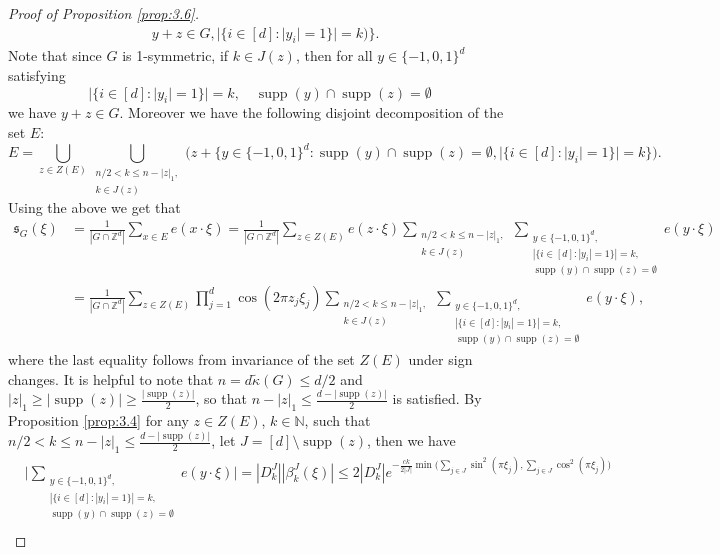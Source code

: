 \documentclass[a4paper,oneside, reqno]{amsart}
\numberwithin{equation}{section}
\theoremstyle{definition}%
\theoremstyle{definition}
\theoremstyle{definition}%
\theoremstyle{definition}
\newcommand{\Z}{\mathbb{Z}}
\newcommand{\N}{\mathbb{N}}
\DeclareMathOperator{\supp}{supp}
\begin{document}
\begin{proof}[Proof of Proposition \ref{prop:3.6}]
\begin{align*}
    &y+z \in G,|\{i \in [d]: |y_i|=1 \}|=k \Big)\Big\}.
\end{align*}
Note that since $G$ is 1-symmetric, if $k \in J(z)$, then for all $y \in \{-1,0,1\}^d$ satisfying
\[
|\{i \in [d]: |y_i|=1 \}|=k, \quad \supp(y) \cap \supp(z)= \emptyset
\]
we have $y+z \in G$.
Moreover we have the following disjoint decomposition of the set $E$:
\[
E= \bigcup_{z \in Z(E)} \bigcup_{\substack{n/2<k \leq n-|z|_1, \\ k \in J(z)}} \Big(z+ \Big\{y \in \{-1,0,1\}^d: \supp(y) \cap \supp(z)= \emptyset, |\{i \in [d]: |y_i|=1 \}|=k\Big\}\Big).
\]
Using the above we get that
\begin{equation} \label{eq:3.9}
 \begin{split} 
    \mathfrak{s}_G(\xi)&= \frac{1}{|G\cap \Z^d|} \sum_{x \in E} e(x \cdot \xi)= \frac{1}{|G\cap \Z^d|}\sum_{z \in Z(E)} e(z \cdot \xi) \sum_{\substack{n/2<k \leq n-|z|_1, \\ k \in J(z)}} \sum_{\substack{y \in \{-1,0,1\}^d, \\ |\{i \in [d]: |y_i|=1\}|=k, \\
    \supp(y) \cap \supp(z)= \emptyset}} e(y \cdot \xi)
    \\
    &=\frac{1}{|G\cap \Z^d|}\sum_{z \in Z(E)} \prod_{j=1}^d \cos(2 \pi z_j \xi_j) \sum_{\substack{n/2<k \leq n-|z|_1, \\ k \in J(z)}} \sum_{\substack{y \in \{-1,0,1\}^d, \\ |\{i \in [d]: |y_i|=1\}|=k, \\
    \supp(y) \cap \supp(z)= \emptyset}} e(y \cdot \xi),
 \end{split}   
\end{equation}
where the last equality follows from invariance of the set $Z(E)$ under sign changes. It is helpful to note that $n =d \widetilde{\kappa}(G) \le d/2$ and $|z |_1 \ge |\supp(z)| \ge \frac{|\supp(z)|}{2}$, so that $n- |z |_1\le \frac{d- |\supp(z)|}{2}$ is satisfied.
By Proposition \ref{prop:3.4} for any $z \in Z(E)$, $k \in \N$, such that $ n/2 < k \le n -|z|_1 \le \frac{d-|\supp(z)|}{2}  $, let $J= [d] \setminus \supp(z)$, then we have
\begin{align*}
&\bigg|\sum_{\substack{y \in \{-1,0,1\}^d, \\ |\{i \in [d]: |y_i|=1\}|=k, \\
    \supp(y) \cap \supp(z)= \emptyset}} e(y \cdot \xi) \bigg|= |D_k^{J}| |\beta_k^{ J}(\xi)| \leq 2|D_k^{J}| e^{-\frac{ck}{2|J|} \min\big( \sum_{j \in J} \sin^2(\pi \xi_j), \sum_{j \in J} \cos^2(\pi \xi_j) \big)}  \\

\end{align*}
\end{proof}
\end{document}
